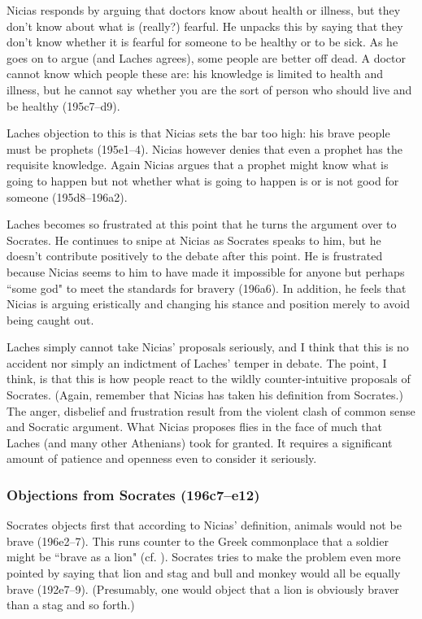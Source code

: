 \documentclass[11pt]{article}
\begin{document}
Nicias responds by arguing that doctors know about health or illness, but they
don't know about what is (really?) fearful.  He unpacks this by saying that
they don't know whether it is fearful for someone to be healthy or to be sick.
As he goes on to argue (and Laches agrees), some people are better off dead.
A doctor cannot know which people these are: his knowledge is limited to health
and illness, but he cannot say whether you are the sort of person who should
live and be healthy (195c7--d9).

Laches objection to this is that Nicias sets the bar too high: his brave people
must be prophets (195e1--4).  Nicias however denies that even a prophet has the
requisite knowledge.  Again Nicias argues that a prophet might know what is
going to happen but not whether what is going to happen is or is not good for
someone (195d8--196a2).

Laches becomes so frustrated at this point that he turns the argument over to
Socrates.  He continues to snipe at Nicias as Socrates speaks to him, but he
doesn't contribute positively to the debate after this point.  He is frustrated
because Nicias seems to him to have made it impossible for anyone but perhaps
``some god" to meet the standards for bravery (196a6).  In addition, he feels
that Nicias is arguing eristically and changing his stance and position merely
to avoid being caught out.

Laches simply cannot take Nicias' proposals seriously, and I think that this is
no accident nor simply an indictment of Laches' temper in debate.  The point,
I think, is that this is how people react to the wildly counter-intuitive
proposals of Socrates.  (Again, remember that Nicias has taken his definition
from Socrates.)  The anger, disbelief and frustration result from the violent
clash of common sense and Socratic argument.  What Nicias proposes flies in the
face of much that Laches (and many other Athenians) took for granted.  It
requires a significant amount of patience and openness even to consider it
seriously.


\subsubsection{Objections from Socrates (196c7--e12)}

Socrates objects first that according to Nicias' definition, animals would not
be brave (196e2--7).  This runs counter to the Greek commonplace that a soldier
might be ``brave as a lion" (cf.  ).  Socrates
tries to make the problem even more pointed by saying that lion and stag and
bull and monkey would all be equally brave (192e7--9).  (Presumably, one would
object that a lion is obviously braver than a stag and so forth.)
\end{document}
